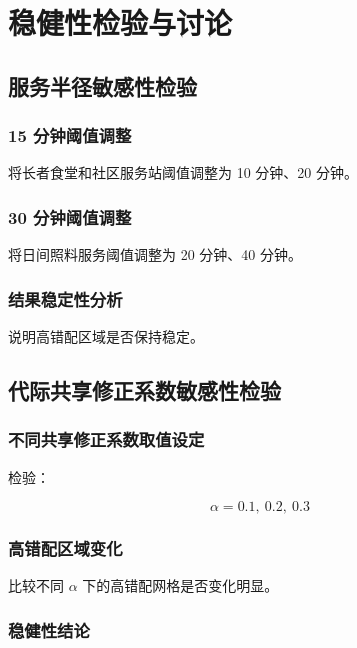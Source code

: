 \documentclass[UTF8,zihao=-4,a4paper,fontset=none]{ctexart}
\begin{document}
\section{稳健性检验与讨论}

\subsection{服务半径敏感性检验}

\subsubsection{15 分钟阈值调整}

将长者食堂和社区服务站阈值调整为 10 分钟、20 分钟。

\subsubsection{30 分钟阈值调整}

将日间照料服务阈值调整为 20 分钟、40 分钟。

\subsubsection{结果稳定性分析}

说明高错配区域是否保持稳定。

\subsection{代际共享修正系数敏感性检验}

\subsubsection{不同共享修正系数取值设定}

检验：

\begin{equation}
\alpha = 0.1,\ 0.2,\ 0.3
\end{equation}

\subsubsection{高错配区域变化}

比较不同 $\alpha$ 下的高错配网格是否变化明显。

\subsubsection{稳健性结论}
\end{document}
